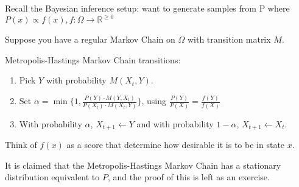 \documentclass[twoside]{article}
\def\beginrefs{\begin{list}%
        {[\arabic{equation}]}{\usecounter{equation}
         \setlength{\leftmargin}{2.0truecm}\setlength{\labelsep}{0.4truecm}%
         \setlength{\labelwidth}{1.6truecm}}}
\def\endrefs{\end{list}}
\def\bibentry#1{\item[\hbox{[#1]}]}
\begin{document}
Recall the Bayesian inference setup: want to generate samples from P where $P(x) \propto f(x), f: \Omega \rightarrow \mathbb{R}^{\geq 0}$

Suppose you have a regular Markov Chain on $\Omega$ with transition matrix $M$.

Metropolis-Hastings Markov Chain transitions:

\begin{enumerate}
   \item Pick $Y$ with probability $M(X_t, Y)$.
   \item Set $\alpha = \min\{ 1, \frac{P(Y) \cdot M(Y, X_t)}{P(X_t) \cdot M(X_t, Y)} \}$, using $\frac{P(Y)}{P(X)} = \frac{f(Y)}{f(X)}$
   \item With probability $\alpha$, $X_{t+1} \leftarrow Y$ and with probability $1 - \alpha$, $X_{t+1} \leftarrow X_t$.
\end{enumerate}

Think of $f(x)$ as a score that determine how desirable it is to be in state $x$.

It is claimed that the Metropolis-Hastings Markov Chain has a stationary distribution equivalent to $P$, and the proof of this is left as an exercise.


\end{document}

